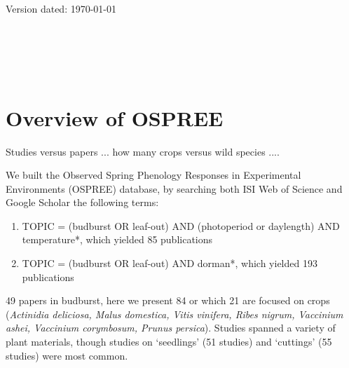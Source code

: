 \documentclass[11pt]{article}
\begin{document}
\renewcommand{\thetable}{S\arabic{table}}
\renewcommand{\thefigure}{S\arabic{figure}}


\renewcommand{\refname}{\CHead{}}
\begin{flushright}
Version dated: \today
\end{flushright}
\bigskip
\medskip
\begin{center}

\\ 
\bigskip

\\ %
\\
\end{center}


\section{Overview of OSPREE}
Studies versus papers ... how many crops versus wild species ....


We built the Observed Spring Phenology Responses in Experimental Environments (OSPREE) database, by searching  both ISI Web of Science and Google Scholar  the following terms: 
\begin{enumerate}
\item TOPIC = (budburst OR leaf-out) AND (photoperiod or daylength) AND temperature*, which yielded 85 publications
\item TOPIC = (budburst OR leaf-out) AND dorman*, which yielded 193 publications
\end{enumerate}

49 papers in budburst, here we present 84 or which 21 are focused on crops (\emph{Actinidia deliciosa, Malus domestica, Vitis vinifera, Ribes nigrum, Vaccinium ashei, Vaccinium corymbosum, Prunus persica}). Studies spanned a variety of plant materials, though studies on `seedlings' (51 studies) and `cuttings' (55 studies) were most common. 
\end{document}
